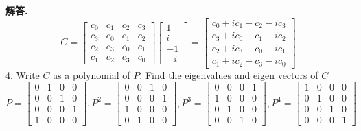 \documentclass[12pt, a4paper, oneside]{article}
\newenvironment{solution}{\par\noindent\textbf{解答. }}{\par}
\begin{document}
\begin{CJK}{UTF8}{gbsn}
\begin{solution}
  $$ 
  C = \begin{bmatrix}
    c_0 & c_1 & c_2 & c_3 \\
    c_3 & c_0 & c_1 & c_2 \\ 
    c_2 & c_3 & c_0 & c_1 \\ 
    c_1 & c_2 & c_3 & c_0
  \end{bmatrix} \begin{bmatrix}
    1 \\ i \\ -1 \\ -i 
  \end{bmatrix} =
  \begin{bmatrix}
    c_0 + ic_1 - c_2 - ic_3 \\
    c_3 + ic_0 - c_1 - ic_2 \\ 
    c_2 + ic_3 - c_0 - ic_1 \\ 
    c_1 + ic_2 - c_3 - ic_0
  \end{bmatrix}
  $$ 
  4. Write $C$ as a polynomial of $P$. Find the eigenvalues and eigen vectors of $C$
  $$
  P = \begin{bmatrix}
    0 & 1 & 0 & 0 \\
    0 & 0 & 1 & 0 \\
    0 & 0 & 0 & 1 \\
    1 & 0 & 0 & 0
  \end{bmatrix},
  P^2 = \begin{bmatrix}
    0 & 0 & 1 & 0 \\
    0 & 0 & 0 & 1 \\
    1 & 0 & 0 & 0 \\
    0 & 1 & 0 & 0
  \end{bmatrix},
  P^3 = \begin{bmatrix}
    0 & 0 & 0 & 1 \\
    1 & 0 & 0 & 0 \\
    0 & 1 & 0 & 0 \\
    0 & 0 & 1 & 0
  \end{bmatrix}, 
  P^4 = \begin{bmatrix}
    1 & 0 & 0 & 0 \\
    0 & 1 & 0 & 0 \\
    0 & 0 & 1 & 0 \\
    0 & 0 & 0 & 1
  \end{bmatrix}
  $$


\end{solution}
\end{CJK}
\end{document}
